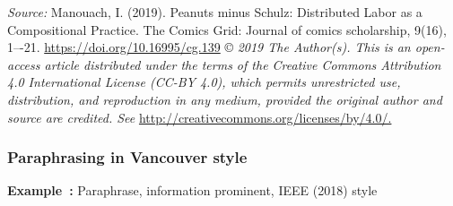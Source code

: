 \documentclass[english, 12pt, a4paper, elec, utf8, a-2b, online]{aaltothesis}
\begin{document}
\vspace{1ex}
\noindent
{}

\vspace{1ex}
\noindent
\textit{Source:} Manouach, I. (2019). Peanuts minus Schulz: Distributed Labor as
a Compositional Practice. The Comics Grid: Journal of comics scholarship, 9(16), 
1–-21. \url{https://doi.org/10.16995/cg.139} \copyright{}
\textit{2019 The Author(s). This is an open-access article distributed under the
	terms of the Creative Commons Attribution 4.0 International License (CC-BY 
	4.0), which permits unrestricted use, distribution, and reproduction in any 
	medium, provided the original author and source are credited. See}
 \url{http://creativecommons.org/licenses/by/4.0/.}


\subsubsection*{Paraphrasing in Vancouver style}

\textsf{\textbf{Example~\theexample:}} Paraphrase, information prominent, IEEE 
(2018) style
\end{document}
